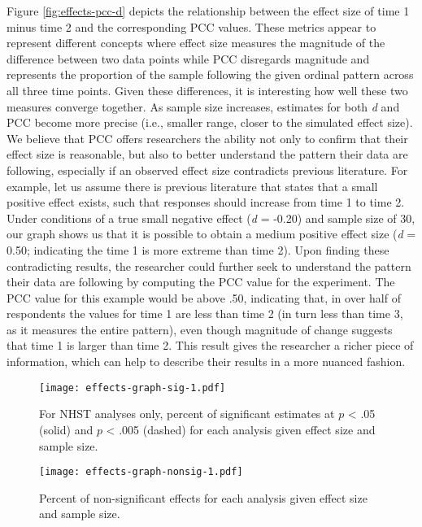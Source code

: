 \documentclass[,man, mask]{apa6}
\theoremstyle{definition}
\theoremstyle{definition}
\theoremstyle{definition}
\theoremstyle{remark}
\begin{document}
Figure \ref{fig:effects-pcc-d} depicts the relationship between the
effect size of time 1 minus time 2 and the corresponding PCC values.
These metrics appear to represent different concepts where effect size
measures the magnitude of the difference between two data points while
PCC disregards magnitude and represents the proportion of the sample
following the given ordinal pattern across all three time points. Given
these differences, it is interesting how well these two measures
converge together. As sample size increases, estimates for both \emph{d}
and PCC become more precise (i.e., smaller range, closer to the
simulated effect size). We believe that PCC offers researchers the
ability not only to confirm that their effect size is reasonable, but
also to better understand the pattern their data are following,
especially if an observed effect size contradicts previous literature.
For example, let us assume there is previous literature that states that
a small positive effect exists, such that responses should increase from
time 1 to time 2. Under conditions of a true small negative effect
(\emph{d} = -0.20) and sample size of 30, our graph shows us that it is
possible to obtain a medium positive effect size (\emph{d} = 0.50;
indicating the time 1 is more extreme than time 2). Upon finding these
contradicting results, the researcher could further seek to understand
the pattern their data are following by computing the PCC value for the
experiment. The PCC value for this example would be above .50,
indicating that, in over half of respondents the values for time 1 are
less than time 2 (in turn less than time 3, as it measures the entire
pattern), even though magnitude of change suggests that time 1 is larger
than time 2. This result gives the researcher a richer piece of
information, which can help to describe their results in a more nuanced
fashion.

\begin{figure}
\centering
\texttt{[image: effects-graph-sig-1.pdf]}
\caption{\label{fig:effects-graph-sig}For NHST analyses only, percent of
significant estimates at \(p\) \textless{} .05 (solid) and \(p\)
\textless{} .005 (dashed) for each analysis given effect size and sample
size.}
\end{figure}

\begin{figure}
\centering
\texttt{[image: effects-graph-nonsig-1.pdf]}
\caption{\label{fig:effects-graph-nonsig}Percent of non-significant effects
for each analysis given effect size and sample size.}
\end{figure}
\end{document}
